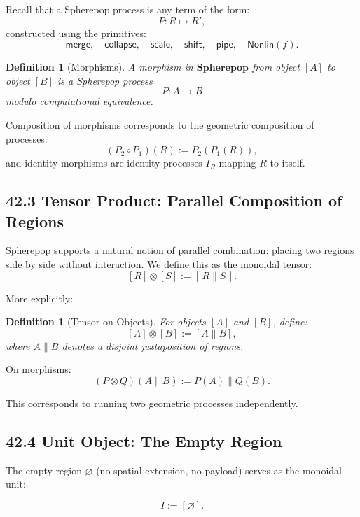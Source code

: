 \documentclass[12pt,letterpaper]{article}
\newtheorem{definition}[theorem]{Definition}
\theoremstyle{remark}
\begin{document}
Recall that a Spherepop process is any term of the form:
\[
P : R \mapsto R',
\]
constructed using the primitives:
\[
\mathsf{merge},\quad \mathsf{collapse},\quad \mathsf{scale},\quad \mathsf{shift},\quad \mathsf{pipe},\quad \mathsf{Nonlin}(f).
\]

\begin{definition}[Morphisms]
A morphism in $\mathbf{Spherepop}$ from object $[A]$ to object $[B]$ is a Spherepop process 
\[
P : A \to B
\]
modulo computational equivalence.
\end{definition}

Composition of morphisms corresponds to the geometric composition of processes:
\[
(P_2 \circ P_1)(R) := P_2(P_1(R)),
\]
and identity morphisms are identity processes $I_R$ mapping $R$ to itself.

\subsection{42.3 Tensor Product: Parallel Composition of Regions}

Spherepop supports a natural notion of parallel combination: placing two regions side by side without interaction. We define this as the monoidal tensor:
\[
[R] \otimes [S] := [\,R \parallel S\,].
\]

More explicitly:

\begin{definition}[Tensor on Objects]
For objects $[A]$ and $[B]$, define:
\[
[A] \otimes [B] := [A \parallel B],
\]
where $A \parallel B$ denotes a disjoint juxtaposition of regions.
\end{definition}

On morphisms:
\[
(P \otimes Q)(A \parallel B) := P(A) \parallel Q(B).
\]

This corresponds to running two geometric processes independently.

\subsection{42.4 Unit Object: The Empty Region}

The empty region $\varnothing$ (no spatial extension, no payload) serves as the monoidal unit:

\[
I := [\varnothing].
\]
\end{document}
